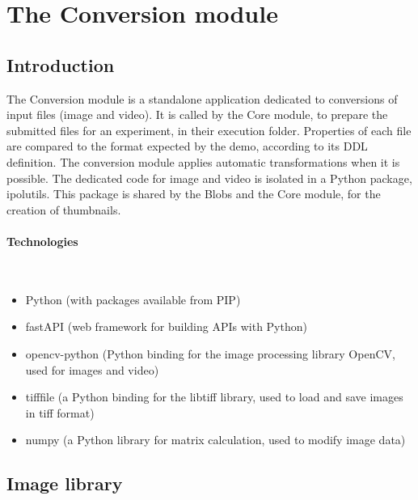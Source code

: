 \section{The Conversion module}
\label{sec:conversion}


\subsection{Introduction}
\label{sec:conversion_introduction}

The Conversion module is a standalone application dedicated to conversions of input files (image and video). It is called by the Core module, to prepare the submitted files for an experiment, in their execution folder. Properties of each file are compared to the format expected by the demo, according to its DDL definition. The conversion module applies automatic transformations when it is possible. The dedicated code for image and video is isolated in a Python package, ipolutils. This package is shared by the Blobs and the Core module, for the creation of thumbnails.

\paragraph{Technologies} \hspace{0pt} \\
\begin{itemize}
\item Python (with packages available from PIP)
\item fastAPI (web framework for building APIs with Python)
\item opencv-python (Python binding for the image processing library OpenCV, used for images and video)
\item tifffile (a Python binding for the libtiff library, used to load and save images in tiff format)
\item numpy (a Python library for matrix calculation, used to modify image data)
\end{itemize}


\subsection{Image library}

